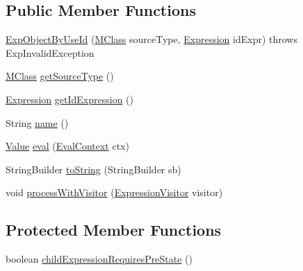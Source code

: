 \subsection*{Public Member Functions}
\begin{DoxyCompactItemize}
\item 
\hyperlink{classorg_1_1tzi_1_1use_1_1uml_1_1ocl_1_1expr_1_1_exp_object_by_use_id_a91b928c70fd6623ec78719d4436d57c4}{Exp\-Object\-By\-Use\-Id} (\hyperlink{interfaceorg_1_1tzi_1_1use_1_1uml_1_1mm_1_1_m_class}{M\-Class} source\-Type, \hyperlink{classorg_1_1tzi_1_1use_1_1uml_1_1ocl_1_1expr_1_1_expression}{Expression} id\-Expr)  throws Exp\-Invalid\-Exception     
\item 
\hyperlink{interfaceorg_1_1tzi_1_1use_1_1uml_1_1mm_1_1_m_class}{M\-Class} \hyperlink{classorg_1_1tzi_1_1use_1_1uml_1_1ocl_1_1expr_1_1_exp_object_by_use_id_ad066671d2e4b69e602e0223af1bdf257}{get\-Source\-Type} ()
\item 
\hyperlink{classorg_1_1tzi_1_1use_1_1uml_1_1ocl_1_1expr_1_1_expression}{Expression} \hyperlink{classorg_1_1tzi_1_1use_1_1uml_1_1ocl_1_1expr_1_1_exp_object_by_use_id_ae37062111934fe8150ad41696f466ad0}{get\-Id\-Expression} ()
\item 
String \hyperlink{classorg_1_1tzi_1_1use_1_1uml_1_1ocl_1_1expr_1_1_exp_object_by_use_id_aa63ef71435b8469d7d8861b90ff2d1cc}{name} ()
\item 
\hyperlink{classorg_1_1tzi_1_1use_1_1uml_1_1ocl_1_1value_1_1_value}{Value} \hyperlink{classorg_1_1tzi_1_1use_1_1uml_1_1ocl_1_1expr_1_1_exp_object_by_use_id_a61c5ff30798c054a57082117bfff34c4}{eval} (\hyperlink{classorg_1_1tzi_1_1use_1_1uml_1_1ocl_1_1expr_1_1_eval_context}{Eval\-Context} ctx)
\item 
String\-Builder \hyperlink{classorg_1_1tzi_1_1use_1_1uml_1_1ocl_1_1expr_1_1_exp_object_by_use_id_a00872a675ea96538e374f3c15b337e7d}{to\-String} (String\-Builder sb)
\item 
void \hyperlink{classorg_1_1tzi_1_1use_1_1uml_1_1ocl_1_1expr_1_1_exp_object_by_use_id_aaca4a890d2bbef1e098219ff12ebf81d}{process\-With\-Visitor} (\hyperlink{interfaceorg_1_1tzi_1_1use_1_1uml_1_1ocl_1_1expr_1_1_expression_visitor}{Expression\-Visitor} visitor)
\end{DoxyCompactItemize}
\subsection*{Protected Member Functions}
\begin{DoxyCompactItemize}
\item 
boolean \hyperlink{classorg_1_1tzi_1_1use_1_1uml_1_1ocl_1_1expr_1_1_exp_object_by_use_id_af602c73abdc8139d759742309956ca80}{child\-Expression\-Requires\-Pre\-State} ()
\end{DoxyCompactItemize}



